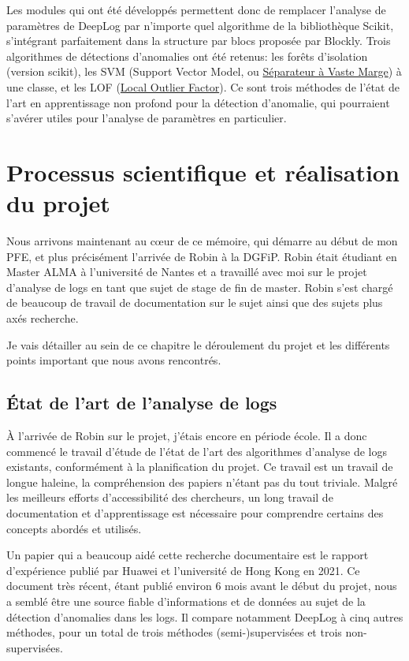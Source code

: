 \documentclass[openany, 11pt]{memoir}
\begin{document}
Les modules qui ont été développés permettent donc de remplacer l'analyse de paramètres de DeepLog par n'importe quel algorithme de la bibliothèque Scikit, s'intégrant parfaitement dans la structure par blocs proposée par Blockly. Trois algorithmes de détections d'anomalies ont été retenus: les forêts d'isolation (version scikit), les SVM (Support Vector Model, ou \href{https://fr.wikipedia.org/wiki/Machine_à_vecteurs_de_support}{Séparateur à Vaste Marge}) à une classe, et les LOF (\href{https://en.wikipedia.org/wiki/Local_outlier_factor}{Local Outlier Factor}). Ce sont trois méthodes de l'état de l'art en apprentissage non profond pour la détection d'anomalie, qui pourraient s'avérer utiles pour l'analyse de paramètres en particulier.

\newpage
\chapter{Processus scientifique et réalisation du projet}

Nous arrivons maintenant au cœur de ce mémoire, qui démarre au début de mon PFE, et plus précisément l'arrivée de Robin à la \gls{DGFiP}. Robin était étudiant en Master ALMA à l'université de Nantes et a travaillé avec moi sur le projet d'analyse de \glspl{log} en tant que sujet de stage de fin de master. Robin s'est chargé de beaucoup de travail de documentation sur le sujet ainsi que des sujets plus axés recherche.

Je vais détailler au sein de ce chapitre le déroulement du projet et les différents points important que nous avons rencontrés.

\section{État de l'art de l'analyse de logs}

À l'arrivée de Robin sur le projet, j'étais encore en période école. Il a donc commencé le travail d'étude de l'état de l'art des algorithmes d'analyse de \glspl{log} existants, conformément à la planification du projet. Ce travail est un travail de longue haleine, la compréhension des papiers n'étant pas du tout triviale. Malgré les meilleurs efforts d'accessibilité des chercheurs, un long travail de documentation et d'apprentissage est nécessaire pour comprendre certains des concepts abordés et utilisés.

Un papier qui a beaucoup aidé cette recherche documentaire est le rapport d'expérience \cite{experiencereport} publié par Huawei et l'université de Hong Kong en 2021. Ce document très récent, étant publié environ 6 mois avant le début du projet, nous a semblé être une source fiable d'informations et de données au sujet de la détection d'anomalies dans les logs. Il compare notamment DeepLog à cinq autres méthodes, pour un total de trois méthodes (semi-)supervisées et trois non-supervisées.
\end{document}
